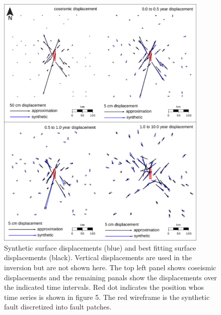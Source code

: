 \documentclass[fleqn,12pt]{article}
\begin{document}
\begin{figure}[h!]\label{figure4}
  \centering
  \includegraphics[width=0.9\textwidth]{FinalFigures/Figure4.pdf}
  \caption{Synthetic surface displacements (blue) and best fitting
    surface displacements (black).  Vertical displacements are used in
    the inversion but are not shown here.  The top left panel shows
    coseismic displacements and the remaining panals show the
    displacements over the indicated time intervals. Red dot indicates
    the position whos time series is shown in figure 5. The red wireframe
    is the synthetic fault discretized into fault patches.}
  \label{figure 4}
\end{figure}
\end{document}
